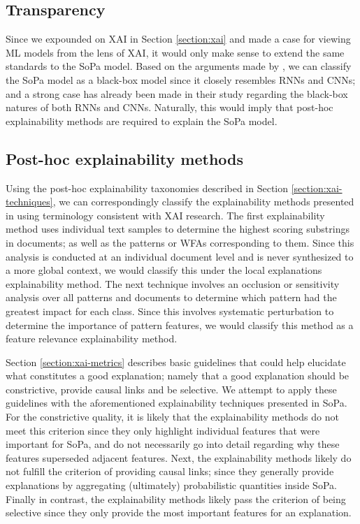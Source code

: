 \subsection{Transparency}

\label{section:sopa-transparency}

Since we expounded on XAI in Section \ref{section:xai} and made a case for
viewing ML models from the lens of XAI, it would only make sense to extend the
same standards to the SoPa model. Based on the arguments made by
\citet{arrieta2020explainable}, we can classify the SoPa model as a black-box
model since it closely resembles RNNs and CNNs; and a strong case has already
been made in their study regarding the black-box natures of both RNNs and CNNs.
Naturally, this would imply that post-hoc explainability methods are required to
explain the SoPa model.

\subsection{Post-hoc explainability methods}

\label{section:sopa-explainability}

Using the post-hoc explainability taxonomies described in Section
\ref{section:xai-techniques}, we can correspondingly classify the explainability
methods presented in \citet{schwartz2018sopa} using terminology consistent with
XAI research. The first explainability method uses individual text samples to
determine the highest scoring substrings in documents; as well as the patterns
or WFAs corresponding to them. Since this analysis is conducted at an individual
document level and is never synthesized to a more global context, we would
classify this under the local explanations explainability method. The next
technique involves an occlusion or sensitivity analysis over all patterns and
documents to determine which pattern had the greatest impact for each class.
Since this involves systematic perturbation to determine the importance of
pattern features, we would classify this method as a feature relevance
explainability method.

Section \ref{section:xai-metrics} describes basic guidelines that could help
elucidate what constitutes a good explanation; namely that a good explanation
should be constrictive, provide causal links and be selective. We attempt to
apply these guidelines with the aforementioned explainability techniques
presented in SoPa. For the constrictive quality, it is likely that the
explainability methods do not meet this criterion since they only highlight
individual features that were important for SoPa, and do not necessarily go into
detail regarding why these features superseded adjacent features. Next, the
explainability methods likely do not fulfill the criterion of providing causal
links; since they generally provide explanations by aggregating (ultimately)
probabilistic quantities inside SoPa. Finally in contrast, the explainability
methods likely pass the criterion of being selective since they only provide the
most important features for an explanation.

